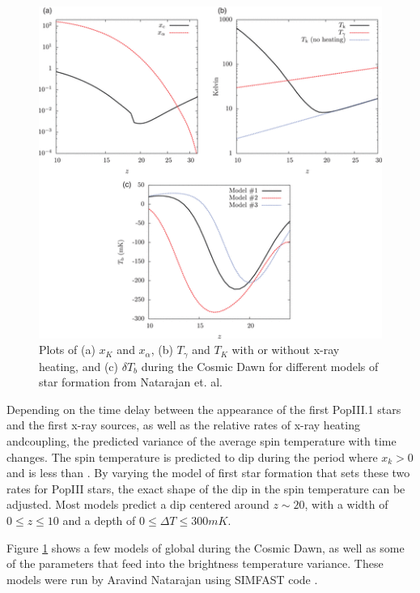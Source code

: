 \begin{figure}[htb]
\begin{center}
\includegraphics[width=0.95\linewidth]{Introduction/figures/ts_evolution.png}
\caption{Plots of (a) $x_K$ and $x_{\alpha}$, (b) $T_\gamma$ and $T_K$ with or without x-ray heating, and (c) $\delta T_b$ during the Cosmic Dawn for different models of star formation from Natarajan et. al. \cite{natarajan_2014}}
\label{Fig:cd_global}
\end{center}
\end{figure}

Depending on the time delay between the appearance of the first PopIII.1 stars and the first x-ray sources, as well as the relative rates of x-ray heating and\lya coupling, the predicted variance of the average spin temperature with time changes. The spin temperature is predicted to dip during the period where $x_k>0$ and \tk is less than \tg. By varying the model of first star formation that sets these two rates for PopIII stars, the exact shape of the dip in the spin temperature can be adjusted. Most models predict a dip centered around $z\sim20$, with a width of $0 \leq z \leq 10$ and a depth of $0\leq \Delta T \leq 300 mK$. 

Figure \ref{Fig:cd_global} shows a few models of global \dtb during the Cosmic Dawn, as well as some of the parameters that feed into the brightness temperature variance. These models were run by Aravind Natarajan using SIMFAST code \cite{simfast}\cite{21cmfast}\cite{natarajan_2014}.  


